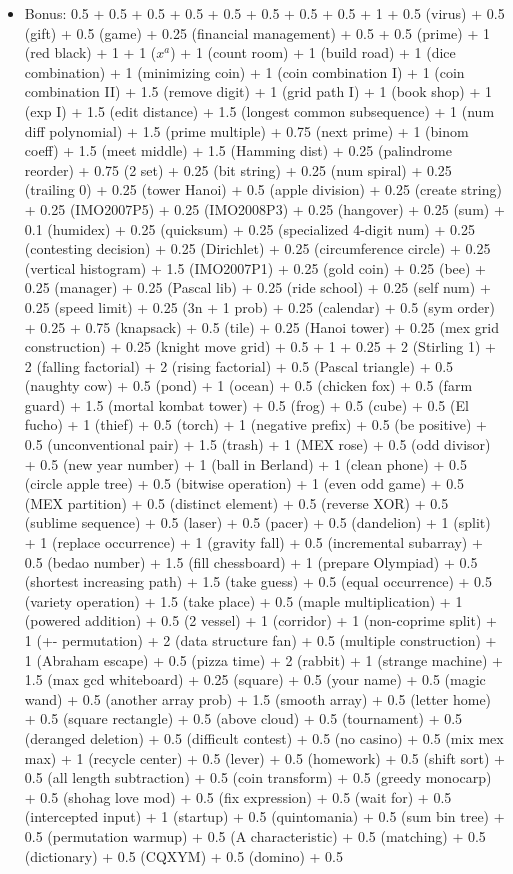 \documentclass{article}
\begin{document}
\begin{enumerate}
\begin{itemize}
		\item Bonus: 0.5 + 0.5 + 0.5 + 0.5 + 0.5 + 0.5 + 0.5 + 0.5 + 1 + 0.5 (virus) + 0.5 (gift) + 0.5 (game) + 0.25 (financial management) + 0.5 + 0.5 (prime) + 1 (red black) + 1 + 1 ($x^a$) + 1 (count room) + 1 (build road) + 1 (dice combination) + 1 (minimizing coin) + 1 (coin combination I) + 1 (coin combination II) + 1.5 (remove digit) + 1 (grid path I) + 1 (book shop) + 1 (exp I) + 1.5 (edit distance) + 1.5 (longest common subsequence) + 1 (num diff polynomial) + 1.5 (prime multiple) + 0.75 (next prime) + 1 (binom coeff) + 1.5 (meet middle) + 1.5 (Hamming dist) + 0.25 (palindrome reorder) + 0.75 (2 set) + 0.25 (bit string) + 0.25 (num spiral) + 0.25 (trailing 0) + 0.25 (tower Hanoi) + 0.5 (apple division) + 0.25 (create string) + 0.25 (IMO2007P5) + 0.25 (IMO2008P3) + 0.25 (hangover) + 0.25 (sum) + 0.1 (humidex) + 0.25 (quicksum) + 0.25 (specialized 4-digit num) + 0.25 (contesting decision) + 0.25 (Dirichlet) + 0.25 (circumference circle) + 0.25 (vertical histogram) + 1.5 (IMO2007P1) + 0.25 (gold coin) + 0.25 (bee) + 0.25 (manager) + 0.25 (Pascal lib) + 0.25 (ride school) + 0.25 (self num) + 0.25 (speed limit) + 0.25 (3n + 1 prob) + 0.25 (calendar) + 0.5 (sym order) + 0.25 + 0.75 (knapsack) + 0.5 (tile) + 0.25 (Hanoi tower) + 0.25 (mex grid construction) + 0.25 (knight move grid) + 0.5 + 1 + 0.25 + 2 (Stirling 1) + 2 (falling factorial) + 2 (rising factorial) + 0.5 (Pascal triangle) + 0.5 (naughty cow) + 0.5 (pond) + 1 (ocean) + 0.5 (chicken fox) + 0.5 (farm guard) + 1.5 (mortal kombat tower) + 0.5 (frog) + 0.5 (cube) + 0.5 (El fucho) + 1 (thief) + 0.5 (torch) + 1 (negative prefix) + 0.5 (be positive) + 0.5 (unconventional pair) + 1.5 (trash) + 1 (MEX rose) + 0.5 (odd divisor) + 0.5 (new year number) + 1 (ball in Berland) + 1 (clean phone) + 0.5 (circle apple tree) + 0.5 (bitwise operation) + 1 (even odd game) + 0.5 (MEX partition) + 0.5 (distinct element) + 0.5 (reverse XOR) + 0.5 (sublime sequence) + 0.5 (laser) + 0.5 (pacer) + 0.5 (dandelion) + 1 (split) + 1 (replace occurrence) + 1 (gravity fall) + 0.5 (incremental subarray) + 0.5 (bedao number) + 1.5 (fill chessboard) + 1 (prepare Olympiad) + 0.5 (shortest increasing path) + 1.5 (take guess) + 0.5 (equal occurrence) + 0.5 (variety operation) + 1.5 (take place) + 0.5 (maple multiplication) + 1 (powered addition) + 0.5 (2 vessel) + 1 (corridor) + 1 (non-coprime split) + 1 (+- permutation) + 2 (data structure fan) + 0.5 (multiple construction) + 1 (Abraham escape) + 0.5 (pizza time) + 2 (rabbit) + 1 (strange machine) + 1.5 (max gcd whiteboard) + 0.25 (square) + 0.5 (your name) + 0.5 (magic wand) + 0.5 (another array prob) + 1.5 (smooth array) + 0.5 (letter home) + 0.5 (square rectangle) + 0.5 (above cloud) + 0.5 (tournament) + 0.5 (deranged deletion) + 0.5 (difficult contest) + 0.5 (no casino) + 0.5 (mix mex max) + 1 (recycle center) + 0.5 (lever) + 0.5 (homework) + 0.5 (shift sort) + 0.5 (all length subtraction) + 0.5 (coin transform) + 0.5 (greedy monocarp) + 0.5 (shohag love mod) + 0.5 (fix expression) + 0.5 (wait for) + 0.5 (intercepted input) + 1 (startup) + 0.5 (quintomania) + 0.5 (sum bin tree) + 0.5 (permutation warmup) + 0.5 (A characteristic) + 0.5 (matching) + 0.5 (dictionary) + 0.5 (CQXYM) + 0.5 (domino) + 0.5 
\end{itemize}
\end{enumerate}
\end{document}
